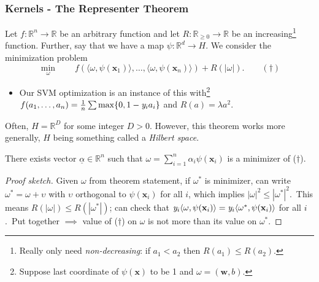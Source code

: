 \documentclass[smaller]{beamer}
\theoremstyle{example}
\newcommand{\x}{\textbf{x}}
\newcommand{\ix}[1]{{\it #1}}
\begin{document}
\begin{frame}
    \frametitle{Kernels - The Representer Theorem}
    Let $f:\mathbb R^n\to\mathbb R$ be an arbitrary function and let $R:\mathbb R_{\ge0}\to\mathbb R$ be an increasing\footnote{Really only need \textit{non-decreasing}: if $a_1<a_2$ then $R(a_1)\le R(a_2)$.} function. Further, say that we have a map $\psi:\mathbb R^d\to H$.\newline\pause  
    We consider the minimization problem 
        \[\min_{\omega} \qquad f\left(\langle\omega, \psi(\x_1)\rangle, \ldots, \langle\omega, \psi(\x_n)\rangle\right) + R(|\omega|). \qquad(\dag)\]
    \pause
    \vspace{-12pt}
    
    \begin{itemize}
        \item  Our SVM optimization is an instance of this with\footnote{Suppose last coordinate of $\psi(\x)$ to be 1 and $\omega = (\textbf{w}, b)$.} $f(a_1,\ldots,a_n) = \frac{1}{n}\sum \max\{0,1-\ix y_ia_i\}$ and $R(a) = \lambda a^2$.
    \end{itemize}
    \pause
    Often, $H = \mathbb R^D$ for some integer $D>0$. However, this theorem works more generally, $H$ being something called a \textit{Hilbert space}.
    \pause
    \begin{theorem}
        There exists vector $\underline\alpha \in\mathbb R^n$ such that $\omega=\sum_{i=1}^n \alpha_i\psi(\x_i)$ is a minimizer of ($\dag$).
    \end{theorem}
    \pause
    \begin{proof}[Proof sketch] 
        {\small Given $\omega$ from theorem statement, if $\omega^*$ is minimizer, can write $\omega^* = \omega + \upsilon$ with $\upsilon$ orthogonal to $\psi(\x_i)$ for all $i$, which implies $|\omega|^2 \le |\omega^*|^2$.\pause\ This means $R(|\omega|)\le R(|\omega^*|)$; can check that $\ix y_i\langle\omega, \psi(\x_i)\rangle = \ix y_i\langle\omega^*, \psi(\x_i)\rangle$ for all $i$.\pause\ 
        Put together $\implies$ value of ($\dag$) on $\omega$ is not more than its value on $\omega^*$.}
    \end{proof}
\end{frame}
\end{document}

